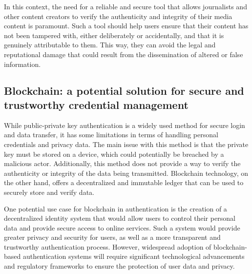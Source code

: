 \documentclass[target=mst,aauheader=]{thud}
\begin{document}
In this context, the need for a reliable and secure tool that allows journalists and other content creators to verify the authenticity and integrity of their media content is paramount. Such a tool should help users ensure that their content has not been tampered with, either deliberately or accidentally, and that it is genuinely attributable to them. This way, they can avoid the legal and reputational damage that could result from the dissemination of altered or false information.

\subsection{Blockchain: a potential solution for secure and trustworthy credential management}

While public-private key authentication is a widely used method for secure login and data transfer, it has some limitations in terms of handling personal credentials and privacy data. The main issue with this method is that the private key must be stored on a device, which could potentially be breached by a malicious actor. Additionally, this method does not provide a way to verify the authenticity or integrity of the data being transmitted. Blockchain technology, on the other hand, offers a decentralized and immutable ledger that can be used to securely store and verify data.\par
One potential use case for blockchain in authentication is the creation of a decentralized identity system that would allow users to control their personal data and provide secure access to online services. Such a system would provide greater privacy and security for users, as well as a more transparent and trustworthy authentication process. However, widespread adoption of blockchain-based authentication systems will require significant technological advancements and regulatory frameworks to ensure the protection of user data and privacy.\par
\end{document}
